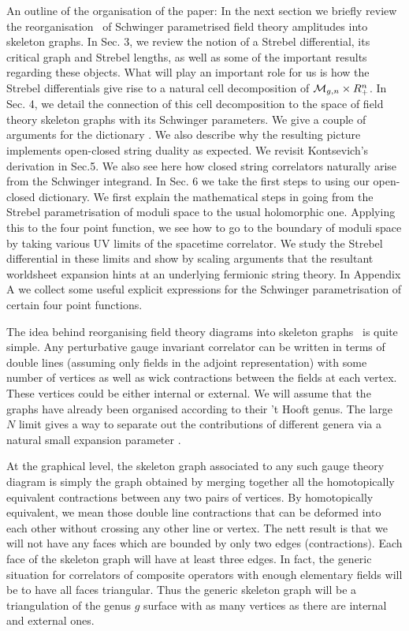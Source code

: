 An outline of the organisation of the paper: In the next section 
we briefly review the reorganisation \ffb\ of Schwinger parametrised 
field theory amplitudes into skeleton graphs. In Sec. 3,
we review the notion of a Strebel 
differential, its critical graph and Strebel lengths, 
as well as some of the important results regarding 
these objects. What will play an important role for us is how 
the Strebel differentials give rise to a natural cell decomposition of 
${\cal M}_{g,n}\times R_{+}^n$. In Sec. 4, we detail the connection
of this cell decomposition 
to the space of field theory skeleton graphs with its Schwinger parameters.
We give a couple of arguments for the dictionary \dic . We also describe why
the resulting picture implements open-closed string duality as expected.
We revisit Kontsevich's derivation in Sec.5. 
We also see here
how closed string correlators naturally arise from the Schwinger 
integrand. In Sec. 6 we take the first steps to using our 
open-closed dictionary. We first explain the mathematical steps 
in going from the Strebel parametrisation of moduli space to the usual 
holomorphic one. Applying this to the four point function, we see how 
to go to the boundary of moduli space by 
taking various UV limits of the spacetime correlator. We study the Strebel
differential in these limits and show by scaling arguments that the 
resultant worldsheet expansion hints at an underlying fermionic string 
theory. In Appendix A we collect some useful explicit 
expressions for the Schwinger parametrisation of certain four point 
functions. 




The idea behind reorganising field theory diagrams into 
skeleton graphs \ffb\ is quite simple. Any perturbative gauge invariant
correlator 
can be written in terms of double lines (assuming only fields 
in the adjoint representation) with some number of vertices as well as 
wick contractions between the fields at each vertex.  These vertices 
could be either internal or external. We will assume that the graphs 
have already been organised according to their 't Hooft genus. 
The large $N$ limit gives a way to separate out the contributions 
of different genera via a natural small expansion parameter \thft .  

At the graphical level, the skeleton
graph associated to any such gauge theory diagram 
is simply the graph obtained by merging together all the homotopically
equivalent contractions between any two pairs of vertices. 
By homotopically equivalent, we mean those double line contractions that can 
be deformed into each other without crossing any other line or vertex. 
The nett result is that we will not have any faces which are bounded by 
only two edges (contractions). Each face of the skeleton graph will have 
at least three edges. In fact, the generic situation for correlators of 
composite operators with enough elementary fields will be to have
all faces triangular. Thus the generic skeleton graph will be a triangulation 
of the genus $g$ surface with as many vertices as there are internal and 
external ones. 

